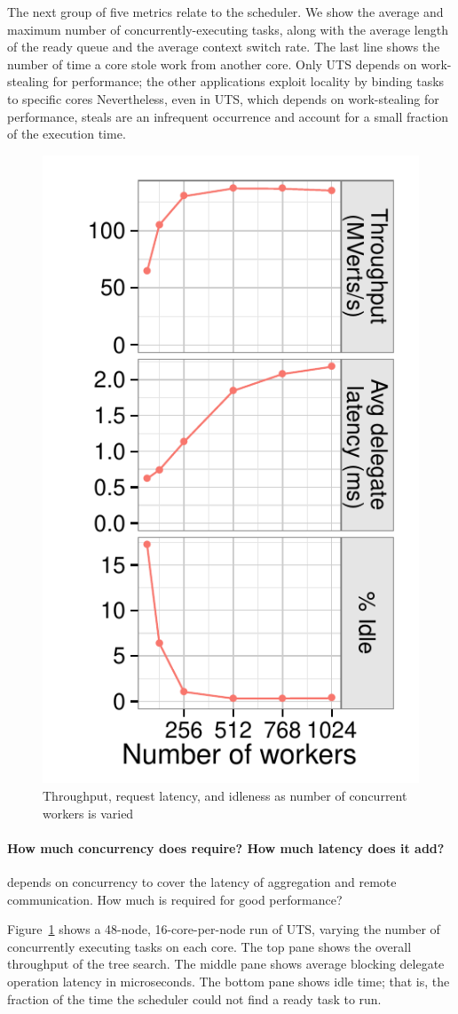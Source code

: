 The next group of five metrics relate to the scheduler. We show the
average and maximum number of concurrently-executing tasks, along with
the average length of the ready queue and the average context switch
rate.  The last line shows the number of time a core stole work from
another core. Only UTS depends on work-stealing for performance; the
other applications exploit locality by binding tasks to specific cores
Nevertheless, even in UTS, which depends on work-stealing for
performance, steals are an infrequent occurrence and account for a
small fraction of the execution time.



\begin{figure}[ht]
    \begin{center}
      \includegraphics[height=0.5\textwidth, angle=90]{results/plot_concurrency.pdf}
    \end{center}
    \vspace*{-0.25in}
    \caption{Throughput, request latency, and idleness as number of concurrent workers is varied}
    \label{fig:grappa-concurrency}
\end{figure}

\paragraph{How much concurrency does \Grappa require? How much latency does it add?}
\Grappa depends on concurrency to cover the latency of aggregation and
remote communication. How much is required for good performance?

Figure~\ref{fig:grappa-concurrency} shows a 48-node, 16-core-per-node
run of UTS, varying the number of concurrently executing tasks on each
core. The top pane shows the overall throughput of the tree search.
The middle pane shows average blocking delegate operation latency in
microseconds. The bottom pane shows idle time; that is, the fraction
of the time the scheduler could not find a ready task to run.

